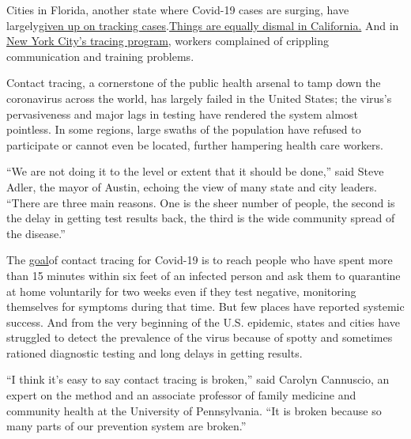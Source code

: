 Cities in Florida, another state where Covid-19 cases are surging, have
largely\href{https://www.nbcmiami.com/news/local/miami-beach-mayor-urges-desantis-to-address-failures-of-floridas-contact-tracing-program/2268324/}{given
up on tracking
cases}.\href{https://www.washingtonpost.com/national/coronavirus-ravaged-florida-as-ron-desantis-sidelined-scientists-and-followed-trump/2020/07/25/0b8008da-c648-11ea-b037-f9711f89ee46_story.htmlhttps://calmatters.org/health/coronavirus/2020/07/california-covid-contact-tracers-video-los-angeles/}{Things
are equally dismal in California.} And in
\href{https://www.nytimes.com/2020/07/29/nyregion/new-york-contact-tracing.html}{New
York City's tracing program}, workers complained of crippling
communication and training problems.

Contact tracing, a cornerstone of the public health arsenal to tamp down
the coronavirus across the world, has largely failed in the United
States; the virus's pervasiveness and major lags in testing have
rendered the system almost pointless. In some regions, large swaths of
the population have refused to participate or cannot even be located,
further hampering health care workers.

``We are not doing it to the level or extent that it should be done,''
said Steve Adler, the mayor of Austin, echoing the view of many state
and city leaders. ``There are three main reasons. One is the sheer
number of people, the second is the delay in getting test results back,
the third is the wide community spread of the disease.''

The
\href{https://www.cdc.gov/coronavirus/2019-ncov/php/contact-tracing/contact-tracing-plan/contact-tracing.html}{goal}of
contact tracing for Covid-19 is to reach people who have spent more than
15 minutes within six feet of an infected person and ask them to
quarantine at home voluntarily for two weeks even if they test negative,
monitoring themselves for symptoms during that time. But few places have
reported systemic success. And from the very beginning of the U.S.
epidemic, states and cities have struggled to detect the prevalence of
the virus because of spotty and sometimes rationed diagnostic testing
and long delays in getting results.

``I think it's easy to say contact tracing is broken,'' said Carolyn
Cannuscio, an expert on the method and an associate professor of family
medicine and community health at the University of Pennsylvania. ``It is
broken because so many parts of our prevention system are broken.''

